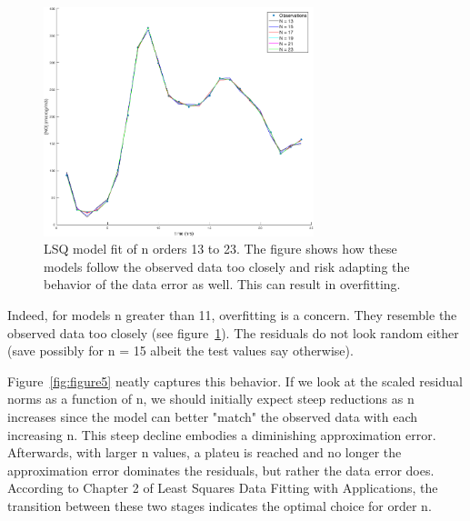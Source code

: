 \begin{figure}[htbp]
\centering
\includegraphics[width=0.7\textwidth]{../img/figure4}
\caption{LSQ model fit of n orders 13 to 23. The figure shows how these models follow the observed data too closely and risk adapting the behavior of the data error as well. This can result in overfitting.}
\label{fig:figure4}
\end{figure}

Indeed, for models n greater than 11, overfitting is a concern. They resemble the observed data too closely (see figure~\ref{fig:figure4}). The residuals do not look random either (save possibly for n = 15 albeit the test values say otherwise). 

Figure~\ref{fig:figure5} neatly captures this behavior. If we look at the scaled residual norms as a function of n, we should initially expect steep reductions as n increases since the model can better "match" the observed data with each increasing n. This steep decline embodies a diminishing approximation error. Afterwards, with larger n values, a plateu is reached and no longer the approximation error dominates the residuals, but rather the data error does. According to Chapter 2 of Least Squares Data Fitting with Applications, the transition between these two stages indicates the optimal choice for order n.  

